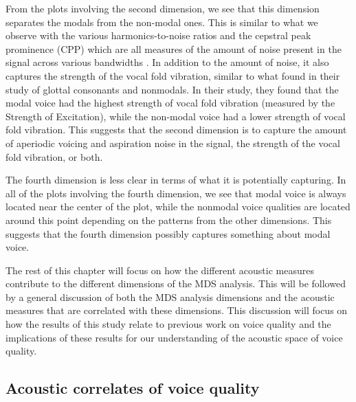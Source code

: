 From the plots involving the second dimension, we see that this dimension separates the modals from the non-modal ones. This is similar to what we observe with the various harmonics-to-noise ratios and the cepstral peak prominence (CPP) which are all measures of the amount of noise present in the signal across various bandwidths \citep{dekromCepstrumBasedTechniqueDetermining1993,hillenbrandAcousticCorrelatesBreathy1996,blankenshipTimingNonmodalPhonation2002,ferrerriesgoWhatMakesCepstral2020}. In addition to the amount of noise, it also captures the strength of the vocal fold vibration, similar to what \citet{garellekVoicingGlottalConsonants2021} found in their study of glottal consonants and nonmodals. In their study, they found that the modal voice had the highest strength of vocal fold vibration (measured by the Strength of Excitation), while the non-modal voice had a lower strength of vocal fold vibration. This suggests that the second dimension is to capture the amount of aperiodic voicing and aspiration noise in the signal, the strength of the vocal fold vibration, or both.

The fourth dimension is less clear in terms of what it is potentially capturing. In all of the plots involving the fourth dimension, we see that modal voice is always located near the center of the plot, while the nonmodal voice qualities are located around this point depending on the patterns from the other dimensions. This suggests that the fourth dimension possibly captures something about modal voice. 

The rest of this chapter will focus on how the different acoustic measures contribute to the different dimensions of the MDS analysis. This will be followed by a general discussion of both the MDS analysis dimensions and the acoustic measures that are correlated with these dimensions. This discussion will focus on how the results of this study relate to previous work on voice quality and the implications of these results for our understanding of the acoustic space of voice quality. 

\subsection{Acoustic correlates of voice quality} \label{sec:acousticlandscape:correlates}

